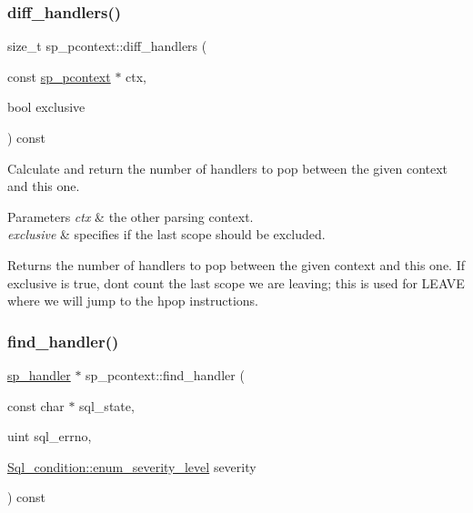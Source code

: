 \subsubsection{\texorpdfstring{diff\+\_\+handlers()}{diff\_handlers()}}
{\footnotesize\ttfamily size\+\_\+t sp\+\_\+pcontext\+::diff\+\_\+handlers (\begin{DoxyParamCaption}\item[{const \mbox{\hyperlink{classsp__pcontext}{sp\+\_\+pcontext}} $\ast$}]{ctx,  }\item[{bool}]{exclusive }\end{DoxyParamCaption}) const}

Calculate and return the number of handlers to pop between the given context and this one.


\begin{DoxyParams}{Parameters}
{\em ctx} & the other parsing context. \\
\hline
{\em exclusive} & specifies if the last scope should be excluded.\\
\hline
\end{DoxyParams}
\begin{DoxyReturn}{Returns}
the number of handlers to pop between the given context and this one. If \textquotesingle{}exclusive\textquotesingle{} is true, don\textquotesingle{}t count the last scope we are leaving; this is used for L\+E\+A\+VE where we will jump to the hpop instructions. 
\end{DoxyReturn}
\mbox{\label{classsp__pcontext_adbcf9a679c86a5cec3cbb2bcf3caec4a}} 
\subsubsection{\texorpdfstring{find\+\_\+handler()}{find\_handler()}}
{\footnotesize\ttfamily \mbox{\hyperlink{classsp__handler}{sp\+\_\+handler}} $\ast$ sp\+\_\+pcontext\+::find\+\_\+handler (\begin{DoxyParamCaption}\item[{const char $\ast$}]{sql\+\_\+state,  }\item[{uint}]{sql\+\_\+errno,  }\item[{\mbox{\hyperlink{classSql__condition_ab0602581e19cddb609bfe10c44be4e83}{Sql\+\_\+condition\+::enum\+\_\+severity\+\_\+level}}}]{severity }\end{DoxyParamCaption}) const}

